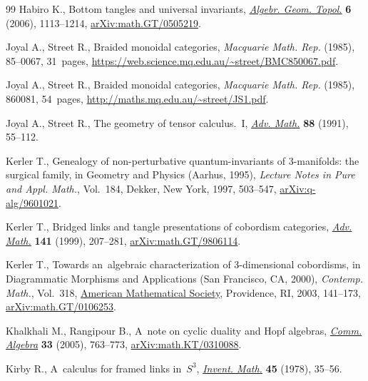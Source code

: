 \begin{thebibliography}{99}
Habiro K., Bottom tangles and universal invariants,
 \href{https://doi.org/10.2140/agt.2006.6.1113}{\textit{Algebr. Geom. Topol.}}
 \textbf{6} (2006), 1113--1214,
 \href{http://arxiv.org/abs/math.GT/0505219}{arXiv:math.GT/0505219}.

Joyal A., Street R., Braided monoidal categories, \textit{Macquarie Math. Rep.}
 (1985), 85--0067, 31~pages,
 \url{https://web.science.mq.edu.au/~street/BMC850067.pdf}.

Joyal A., Street R., Braided monoidal categories, \textit{Macquarie Math. Rep.}
 (1985), 860081, 54~pages, \url{http://maths.mq.edu.au/~street/JS1.pdf}.

Joyal A., Street R., The geometry of tensor calculus.~{I},
 \href{https://doi.org/10.1016/0001-8708(91)90003-P}{\textit{Adv. Math.}}
 \textbf{88} (1991), 55--112.

Kerler T., Genealogy of non-perturbative quantum-invariants of {$3$}-manifolds:
 the surgical family, in Geometry and Physics ({A}arhus, 1995),
 \textit{Lecture Notes in Pure and Appl. Math.}, Vol.~184, Dekker, New York,
 1997, 503--547,
 \href{http://arxiv.org/abs/q-alg/9601021}{arXiv:q-alg/9601021}.

Kerler T., Bridged links and tangle presentations of cobordism categories,
 \href{https://doi.org/10.1006/aima.1998.1772}{\textit{Adv. Math.}}
 \textbf{141} (1999), 207--281,
 \href{http://arxiv.org/abs/math.GT/9806114}{arXiv:math.GT/9806114}.

Kerler T., Towards an~algebraic characterization of 3-dimensional cobordisms,
 in Diagrammatic Morphisms and Applications ({S}an {F}rancisco, {CA}, 2000),
 \textit{Contemp. Math.}, Vol.~318,
 \href{https://doi.org/10.1090/conm/318/05549}{American Mathematical Society},
 Providence, RI, 2003, 141--173,
 \href{http://arxiv.org/abs/math.GT/0106253}{arXiv:math.GT/0106253}.

Khalkhali M., Rangipour B., A~note on cyclic duality and {H}opf algebras,
 \href{https://doi.org/10.1081/AGB-200051130}{\textit{Comm. Algebra}}
 \textbf{33} (2005), 763--773,
 \href{http://arxiv.org/abs/math.KT/0310088}{arXiv:math.KT/0310088}.

Kirby R., A~calculus for framed links in~{$S^{3}$},
 \href{https://doi.org/10.1007/BF01406222}{\textit{Invent. Math.}} \textbf{45}
 (1978), 35--56.


\end{thebibliography}
